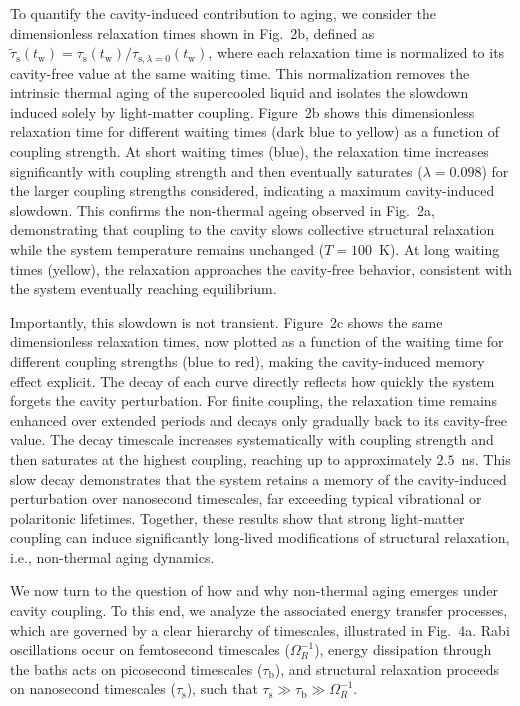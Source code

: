 \documentclass[aps, prl,
 reprint,
 superscriptaddress,
 citeautoscript,  %
 amsmath,amssymb,
 tightenlines
]{revtex4-2}
\begin{document}
To quantify the cavity-induced contribution to aging, we consider the dimensionless relaxation times shown in Fig.~2b, defined as $\tilde{\tau}_\mathrm{s}(t_\mathrm{w}) = \tau_\mathrm{s}(t_\mathrm{w}) / \tau_{\mathrm{s},\lambda=0}(t_\mathrm{w})$, where each relaxation time is normalized to its cavity-free value at the same waiting time. This normalization removes the intrinsic thermal aging of the supercooled liquid and isolates the slowdown induced solely by light-matter coupling. Figure~2b shows this dimensionless relaxation time for different waiting times (dark blue to yellow) as a function of coupling strength. At short waiting times (blue), the relaxation time increases significantly with coupling strength and then eventually saturates ($\lambda = 0.098$) for the larger coupling strengths considered, indicating a maximum cavity-induced slowdown. This confirms the non-thermal ageing observed in Fig.~2a, demonstrating that coupling to the cavity slows collective structural relaxation while the system temperature remains unchanged ($T = 100$~K). At long waiting times (yellow), the relaxation approaches the cavity-free behavior, consistent with the system eventually reaching equilibrium.


Importantly, this slowdown is not transient. Figure~2c shows the same dimensionless relaxation times, now plotted as a function of the waiting time for different coupling strengths (blue to red), making the cavity-induced memory effect explicit. The decay of each curve directly reflects how quickly the system forgets the cavity perturbation. For finite coupling, the relaxation time remains enhanced over extended periods and decays only gradually back to its cavity-free value. The decay timescale increases systematically with coupling strength and then saturates at the highest coupling, reaching up to approximately $2.5$~ns. This slow decay demonstrates that the system retains a memory of the cavity-induced perturbation over nanosecond timescales, far exceeding typical vibrational or polaritonic lifetimes. Together, these results show that strong light-matter coupling can induce significantly long-lived modifications of structural relaxation, i.e., non-thermal aging dynamics.


We now turn to the question of how and why non-thermal aging emerges under cavity coupling. To this end, we analyze the associated energy transfer processes, which are governed by a clear hierarchy of timescales, illustrated in Fig.~4a. Rabi oscillations occur on femtosecond timescales ($\Omega_R^{-1}$), energy dissipation through the baths acts on picosecond timescales ($\tau_\mathrm{b}$), and structural relaxation proceeds on nanosecond timescales ($\tau_\mathrm{s}$), such that $\tau_\mathrm{s} \gg \tau_\mathrm{b} \gg \Omega_R^{-1}$.
\end{document}
